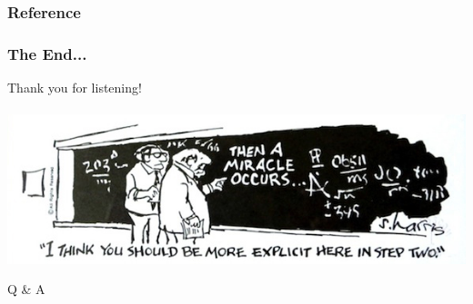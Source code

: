 \documentclass[xcolor=dvipsnames,hyperref={CJKbookmarks=true}]{beamer}
\begin{document}
\begin{frame}%
    \frametitle{Reference}
	\small
    
\end{frame}

\begin{frame}\frametitle{The End...}
\centering
\Large
Thank you for listening! 
~\\
~\\

\includegraphics[width=\linewidth]{miracle-occurs2.jpg}

Q \& A
\end{frame}

\appendix
\end{document}
